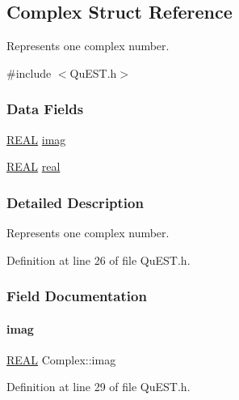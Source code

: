 \hypertarget{structComplex}{}\subsection{Complex Struct Reference}
\label{structComplex}


Represents one complex number.  




{\ttfamily \#include $<$Qu\+E\+S\+T.\+h$>$}

\subsubsection*{Data Fields}
\begin{DoxyCompactItemize}
\item 
\mbox{\hyperlink{QuEST__precision_8h_a4b654506f18b8bfd61ad2a29a7e38c25}{R\+E\+AL}} \mbox{\hyperlink{structComplex_a1151948284b21c0052f203f23ab931d9}{imag}}
\item 
\mbox{\hyperlink{QuEST__precision_8h_a4b654506f18b8bfd61ad2a29a7e38c25}{R\+E\+AL}} \mbox{\hyperlink{structComplex_a479ad939835457595fcca3ca55c06283}{real}}
\end{DoxyCompactItemize}


\subsubsection{Detailed Description}
Represents one complex number. 

Definition at line 26 of file Qu\+E\+S\+T.\+h.



\subsubsection{Field Documentation}
\mbox{\label{structComplex_a1151948284b21c0052f203f23ab931d9}} 
\paragraph{\texorpdfstring{imag}{imag}}
{\footnotesize\ttfamily \mbox{\hyperlink{QuEST__precision_8h_a4b654506f18b8bfd61ad2a29a7e38c25}{R\+E\+AL}} Complex\+::imag}



Definition at line 29 of file Qu\+E\+S\+T.\+h.

\mbox{\label{structComplex_a479ad939835457595fcca3ca55c06283}} 
